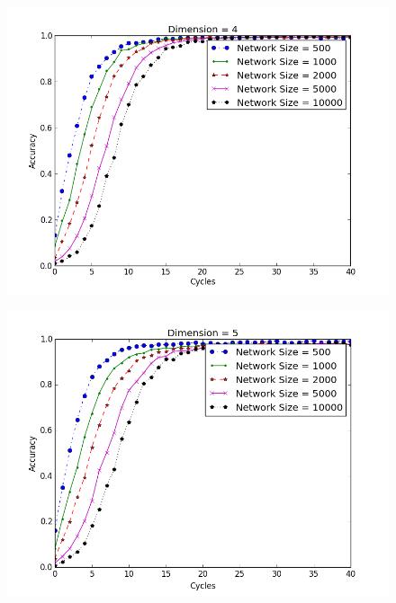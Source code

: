 \documentclass[10pt, conference, letterpaper]{IEEEtran}
\begin{document}
{\begin{figure}
	\centering
	\includegraphics[width=\linewidth]{conv_d4}
	\caption{}
	\label{conv4}
\end{figure}


\begin{figure}
	\centering
	\includegraphics[width=\linewidth]{conv_d5}
	\caption{}
	\label{conv5}
\end{figure}


}
\end{document}
